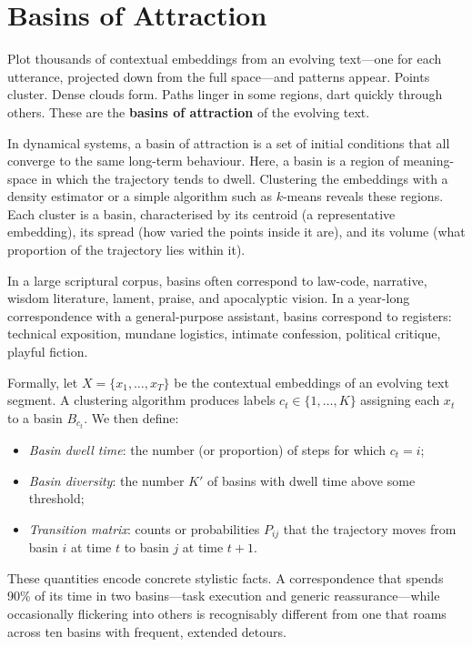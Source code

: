 \documentclass[12pt,a4paper]{article}
\begin{document}
\section{Basins of Attraction}

Plot thousands of contextual embeddings from an evolving text---one for each utterance, projected down from the full space---and patterns appear. Points cluster. Dense clouds form. Paths linger in some regions, dart quickly through others. These are the \textbf{basins of attraction} of the evolving text.

In dynamical systems, a basin of attraction is a set of initial conditions that all converge to the same long-term behaviour. Here, a basin is a region of meaning-space in which the trajectory tends to dwell. Clustering the embeddings with a density estimator or a simple algorithm such as $k$-means reveals these regions. Each cluster is a basin, characterised by its centroid (a representative embedding), its spread (how varied the points inside it are), and its volume (what proportion of the trajectory lies within it).

In a large scriptural corpus, basins often correspond to law-code, narrative, wisdom literature, lament, praise, and apocalyptic vision. In a year-long correspondence with a general-purpose assistant, basins correspond to registers: technical exposition, mundane logistics, intimate confession, political critique, playful fiction.

Formally, let $X = \{x_1, \ldots, x_T\}$ be the contextual embeddings of an evolving text segment. A clustering algorithm produces labels $c_t \in \{1, \ldots, K\}$ assigning each $x_t$ to a basin $B_{c_t}$. We then define:

\begin{itemize}
  \item \emph{Basin dwell time}: the number (or proportion) of steps for which $c_t = i$;
  \item \emph{Basin diversity}: the number $K'$ of basins with dwell time above some threshold;
  \item \emph{Transition matrix}: counts or probabilities $P_{ij}$ that the trajectory moves from basin $i$ at time $t$ to basin $j$ at time $t+1$.
\end{itemize}

These quantities encode concrete stylistic facts. A correspondence that spends 90\% of its time in two basins---task execution and generic reassurance---while occasionally flickering into others is recognisably different from one that roams across ten basins with frequent, extended detours.
\end{document}
